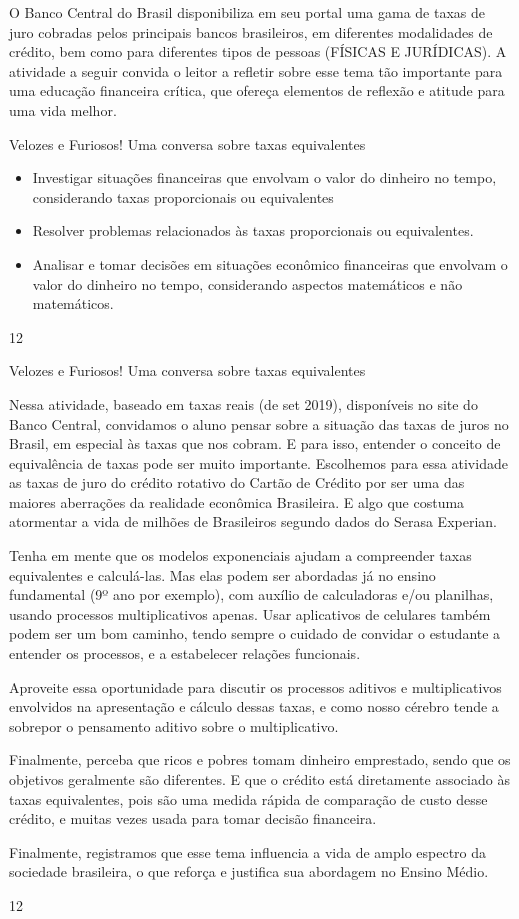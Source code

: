 O Banco Central do Brasil disponibiliza em seu portal uma gama de taxas de juro cobradas pelos principais bancos brasileiros, em diferentes modalidades de crédito, bem como para diferentes tipos de pessoas (FÍSICAS E JURÍDICAS). A atividade a seguir convida o leitor a refletir sobre esse tema tão importante para uma educação financeira crítica, que ofereça elementos de reflexão e atitude para uma vida melhor. 
\clearpage
\begin{objectives}{Velozes e Furiosos! Uma conversa sobre taxas equivalentes}
{
\begin{itemize}
\item Investigar situações financeiras que envolvam o valor do dinheiro no tempo, considerando taxas proporcionais ou equivalentes
\item Resolver problemas relacionados às taxas proporcionais ou equivalentes.
\item Analisar e tomar decisões em situações econômico financeiras que envolvam o valor do dinheiro no tempo, considerando aspectos matemáticos e não matemáticos.
\end{itemize}
}{1}{2}
\end{objectives}
\marginpar{\vspace{-2.5em}}
\begin{sugestions}{Velozes e Furiosos! Uma conversa sobre taxas equivalentes}
{
Nessa atividade, baseado em taxas reais (de set 2019), disponíveis no site do Banco Central, convidamos o aluno pensar sobre a situação das taxas de juros no Brasil, em especial às taxas que nos cobram. E para isso, entender o conceito de equivalência de taxas pode ser muito importante. Escolhemos para essa atividade as taxas de juro do crédito rotativo do Cartão de Crédito por ser uma das maiores aberrações da realidade econômica Brasileira. E algo que costuma atormentar a vida de milhões de Brasileiros segundo dados do Serasa Experian. 

Tenha em mente que os modelos exponenciais ajudam a compreender taxas equivalentes e calculá-las. Mas elas podem ser abordadas já no ensino fundamental (9º ano por exemplo), com auxílio de calculadoras e/ou planilhas, usando processos multiplicativos apenas. Usar aplicativos de celulares também podem ser um bom caminho, tendo sempre o cuidado de convidar o estudante a entender os processos, e a estabelecer relações funcionais. 

Aproveite essa oportunidade para discutir os processos aditivos e multiplicativos envolvidos na apresentação e cálculo dessas taxas, e como nosso cérebro tende a sobrepor o pensamento aditivo sobre o multiplicativo. 

Finalmente, perceba que ricos e pobres tomam dinheiro emprestado, sendo que os objetivos geralmente são diferentes. E que o crédito está diretamente associado às taxas equivalentes, pois são uma medida rápida de comparação de custo desse crédito, e muitas vezes usada para tomar decisão financeira. 

Finalmente, registramos que esse tema influencia a vida de amplo espectro da sociedade brasileira, o que reforça e justifica sua abordagem no Ensino Médio. 

}{1}{2}
\end{sugestions}
